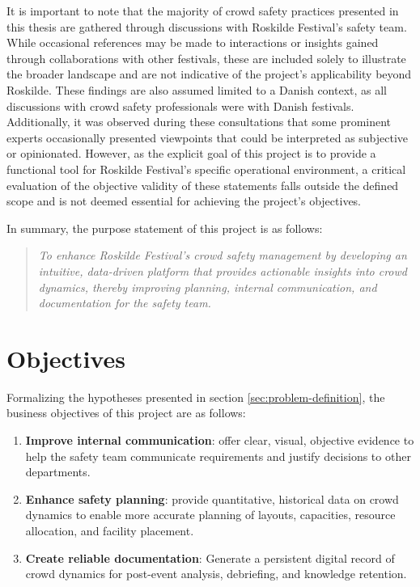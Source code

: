 It is important to note that the majority of crowd safety practices presented in this thesis are gathered through discussions with Roskilde Festival's safety team. While occasional references may be made to interactions or insights gained through collaborations with other festivals, these are included solely to illustrate the broader landscape and are not indicative of the project's applicability beyond Roskilde. These findings are also assumed limited to a Danish context, as all discussions with crowd safety professionals were with Danish festivals. Additionally, it was observed during these consultations that some prominent experts occasionally presented viewpoints that could be interpreted as subjective or opinionated. However, as the explicit goal of this project is to provide a functional tool for Roskilde Festival's specific operational environment, a critical evaluation of the objective validity of these statements falls outside the defined scope and is not deemed essential for achieving the project's objectives.

In summary, the purpose statement of this project is as follows:
\begin{quote}
  \textit{To enhance Roskilde Festival's crowd safety management by developing an intuitive, data-driven platform that provides actionable insights into crowd dynamics, thereby improving planning, internal communication, and documentation for the safety team.}
\end{quote}

\section{Objectives}
\label{sec:objectives}

Formalizing the hypotheses presented in section \ref{sec:problem-definition}, the business objectives of this project are as follows:
\begin{enumerate}
  \item \textbf{Improve internal communication}: offer clear, visual, objective evidence to help the safety team communicate requirements and justify decisions to other departments.
  \item \textbf{Enhance safety planning}: provide quantitative, historical data on crowd dynamics to enable more accurate planning of layouts, capacities, resource allocation, and facility placement.
  \item \textbf{Create reliable documentation}: Generate a persistent digital record of crowd dynamics for post-event analysis, debriefing, and knowledge retention.
\end{enumerate}


